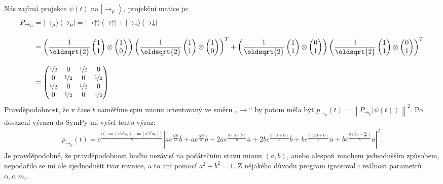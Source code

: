 \documentclass[10pt,a4paper]{article}
\newcommand{\const}[1]{\text{#1}}
\newcommand{\norm}[1]{\left\lVert#1\right\rVert}
\newcommand{\mat}[1]{
    \begin{pmatrix}
        #1
    \end{pmatrix}
}
\newcommand{\bra}[1]{\left< #1 \right|}
\newcommand{\ket}[1]{\left| #1 \right>}
\newcommand{\e}[1]{\const{e}^{#1}}
\begin{document}
Nás zajímá projekce $\psi(t)$ na $\ket{\rightarrow_\mu}$, projekční matice je:
\begin{align*}
    P_{\rightarrow_\mu}
    &= \ket{\rightarrow_\mu} \bra{\rightarrow_\mu}
    = \ket{\rightarrow\uparrow} \bra{\rightarrow\uparrow} +
    \ket{\rightarrow\downarrow} \bra{\rightarrow\downarrow}
    \\[10pt]
    &=
    \left( \frac{1}{\oldsqrt{2}} \mat{1 \\ 1 } \otimes \mat{1 \\ 0} \right)
    \left( \frac{1}{\oldsqrt{2}} \mat{1 \\ 1 } \otimes \mat{1 \\ 0} \right)^T +
    \left( \frac{1}{\oldsqrt{2}} \mat{1 \\ 1 } \otimes \mat{0 \\ 1} \right)
    \left( \frac{1}{\oldsqrt{2}} \mat{1 \\ 1 } \otimes \mat{0 \\ 1} \right)^T
    \\[10pt]
    &= \mat{\nicefrac{1}{2} & 0 & \nicefrac{1}{2} & 0\\0 & \nicefrac{1}{2} & 0 & \nicefrac{1}{2}\\\nicefrac{1}{2} & 0 & \nicefrac{1}{2} & 0\\0 & \nicefrac{1}{2} & 0 & \nicefrac{1}{2}}
\end{align*}
Pravděpodobnost, že v čase $t$ naměříme spin mionu  orientovaný ve směru „$\rightarrow$“ by potom měla být $p_{\rightarrow_\mu}(t) = \norm{ P_{\rightarrow_\mu} \ket{\psi(t)}}^2$. Po dosazení výrazů do SymPy mi vyšel tento výraz:
\begin{align*}
    p_{\rightarrow_\mu}(t) = \e{\frac{t \left(- \operatorname{im}{\left(\alpha^{2} c^{2} m_{r}\right)} + \operatorname{im}{\left(\overline{\alpha}^{2} \overline{c}^{2} \overline{m_{r}}\right)}\right)}{\hbar}} \left|{a e^{\frac{i D t}{2 \hbar}} \overline{b} + a e^{\frac{i D t}{\hbar}} \overline{b} + 2 a e^{\frac{i t \left(A + D\right)}{\hbar}} \overline{a} + 2 b e^{\frac{i t \left(A + D\right)}{\hbar}} \overline{b} + b e^{\frac{i t \left(2 A + D\right)}{\hbar}} \overline{a} + b e^{\frac{i t \left(2 A + \frac{3 D}{2}\right)}{\hbar}} \overline{a}}\right|^{2}.
\end{align*}
Je pravděpodobné, že pravděpodobnost buďto nezávisí na počátečním stavu mionu $(a, b)$, anebo alespoň mnohem jednodušším způsobem, nepodařilo se mi ale zjednodušit tvar rovnice, a to ani pomocí $a^2 + b^2 = 1$. Z nějakého důvodu program ignoroval i reálnost parametrů $\alpha, c, m_r$.
\end{document}
